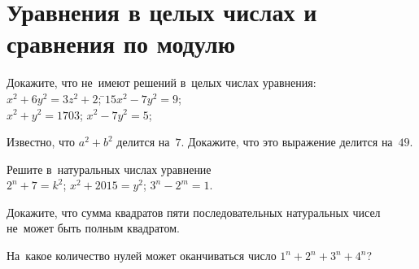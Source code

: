 
\section*{Уравнения в целых числах и сравнения по модулю}


\begin{problems}

\item \begin{tabbing}
Докажите, что не~имеют решений в~целых числах уравнения:
\\
\subproblem $x^2 + 6y^2 = 3z^2 + 2$;
\qquad\=
\subproblem $15 x^2 - 7 y^2 = 9$;
\\
\subproblem $x^2 + y^2 = 1703$;
\qquad\>
\subproblem $x^2 - 7 y^2 = 5$;
\end{tabbing}

\item
Известно, что $a^2 + b^2$ делится на~$7$.
Докажите, что это выражение делится на~$49$.

\item
Решите в~натуральных числах уравнение
\\
\subproblem $2^n + 7 = k^2$;
\qquad
\subproblem $x^2 + 2015 = y^2$;
\qquad
\subproblem $3^n - 2^m = 1$.

\item
Докажите, что сумма квадратов пяти последовательных натуральных чисел не~может
быть полным квадратом.

\item
На~какое количество нулей может оканчиваться число $1^n + 2^n + 3^n + 4^n$?

\end{problems}

